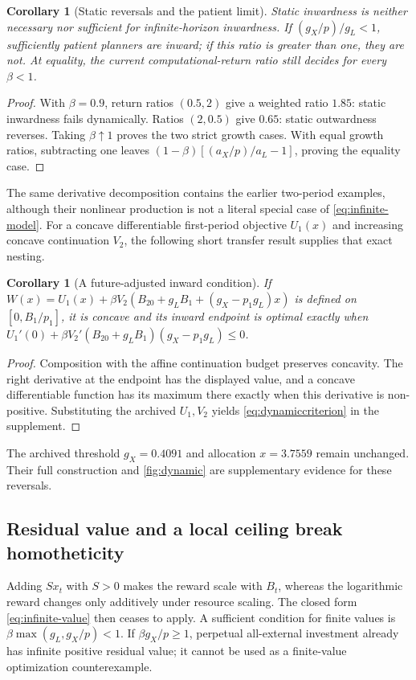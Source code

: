 \documentclass[11pt,a4paper]{article}
\newtheorem{corollary}[proposition]{Corollary}
\theoremstyle{definition}\newtheorem{definition}{Definition}
\newcommand{\DynamicThreshold}{0.4091}
\newcommand{\DynamicOutward}{3.7559}
\begin{document}
\begin{corollary}[Static reversals and the patient limit]
\label{cor:infinite-reversals}
Static inwardness is neither necessary nor sufficient for infinite-horizon
inwardness. If $(g_X/p)/g_L<1$, sufficiently patient planners are inward;
if this ratio is greater than one, they are not. At equality, the current
computational-return ratio still decides for every $\beta<1$.
\end{corollary}
\begin{proof}
With $\beta=0.9$, return ratios $(0.5,2)$ give a weighted ratio $1.85$:
static inwardness fails dynamically. Ratios $(2,0.5)$ give $0.65$:
static outwardness reverses. Taking $\beta\uparrow1$ proves the two
strict growth cases. With equal growth ratios, subtracting one leaves
$(1-\beta)[(a_X/p)/a_L-1]$, proving the equality case.
\end{proof}

The same derivative decomposition contains the earlier two-period
examples, although their nonlinear production is not a literal special
case of \cref{eq:infinite-model}. For a concave differentiable first-period
objective $U_1(x)$ and increasing concave continuation $V_2$, the following
short transfer result supplies that exact nesting.
\begin{corollary}[A future-adjusted inward condition]
\label{prop:dynamic}
If $W(x)=U_1(x)+\beta V_2(B_{20}+g_LB_1+(g_X-p_1g_L)x)$
is defined on $[0,B_1/p_1]$, it is concave and its inward endpoint is
optimal exactly when
$U_1'(0)+\beta V_2'(B_{20}+g_LB_1)(g_X-p_1g_L)\leq0$.
\end{corollary}
\begin{proof}
Composition with the affine continuation budget preserves concavity.
The right derivative at the endpoint has the displayed value, and a
concave differentiable function has its maximum there exactly when this
derivative is non-positive. Substituting the archived $U_1,V_2$ yields
\cref{eq:dynamiccriterion} in the supplement.
\end{proof}
The archived threshold $g_X=\DynamicThreshold$ and allocation
$x=\DynamicOutward$ remain unchanged. Their full construction and
\cref{fig:dynamic} are supplementary evidence for these reversals.

\subsection{Residual value and a local ceiling break homotheticity}
Adding $Sx_t$ with $S>0$ makes the reward scale with $B_t$, whereas the
logarithmic reward changes only additively under resource scaling. The
closed form \cref{eq:infinite-value} then ceases to apply. A sufficient
condition for finite values is
$\beta\max(g_L,g_X/p)<1$. If $\beta g_X/p\geq1$, perpetual
all-external investment already has infinite positive residual value;
it cannot be used as a finite-value optimization counterexample.
\end{document}

